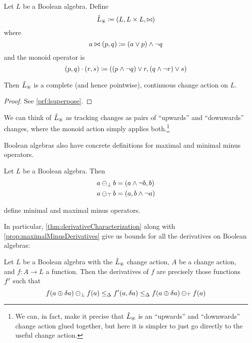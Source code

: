 \begin{prop}[name=Boolean algebra change actions, restate=lsuperpose]
  Let $L$ be a Boolean algebra. Define
  \begin{displaymath}
    \hat{L}_\circledast \coloneqq (L,L \times L,\bowtie)
  \end{displaymath}
  where
  \begin{displaymath}
    a \bowtie (p, q) \coloneqq (a \vee p) \wedge \neg q
  \end{displaymath}
  and the monoid operator is
  \begin{displaymath}
    (p, q) \cdot (r, s) \coloneqq ((p \wedge \neg q) \vee r, (q \wedge \neg r) \vee s)
  \end{displaymath}

  Then $\hat{L}_\circledast$ is a complete (and hence pointwise), continuous change action on $L$.
\end{prop}
\ifproofs
\begin{proof}
  See \cref{prf:lsuperpose}.
\end{proof}
\fi

We can think of $\hat{L}_\circledast$ as tracking changes as pairs of ``upwards'' and
``downwards'' changes, where the monoid action simply applies both.\footnote{We
  can, in fact, make it precise that $\hat{L}_\circledast$ is an ``upwards''
  and ``downwards'' change action glued together, but here it is simpler to
  just go directly to the useful change action.}  

Boolean algebras also have concrete definitions for maximal and minimal minus
operators.

\begin{prop}
  Let $L$ be a Boolean algebra. Then
  \begin{align*}
    a \ominus_\bot b &= (a \wedge \neg b, b)\\
    a \ominus_\top b &= (a, b \wedge \neg a)
  \end{align*}

  define minimal and maximal minus operators.
\end{prop}

In particular, \cref{thm:derivativeCharacterization} along with
\cref{prop:maximalMinusDerivatives} give us bounds for
all the derivatives on Boolean algebras:

\begin{corollary}
\label{cor:booleanCharacterization}
  Let $L$ be a Boolean algebra with the $\hat{L}_\circledast$ change action, $A$ be
  a change action, and $f: A \rightarrow
  L$ a function. Then the derivatives of $f$ are precisely those functions
  $f'$ such that
  \begin{displaymath}
    f(a \oplus \delta a) \ominus_\bot f(a)
    \leq_\Delta
    f'(a, \delta a)
    \leq_\Delta
    f(a \oplus \delta a) \ominus_\top f(a)
  \end{displaymath}
\end{corollary}

